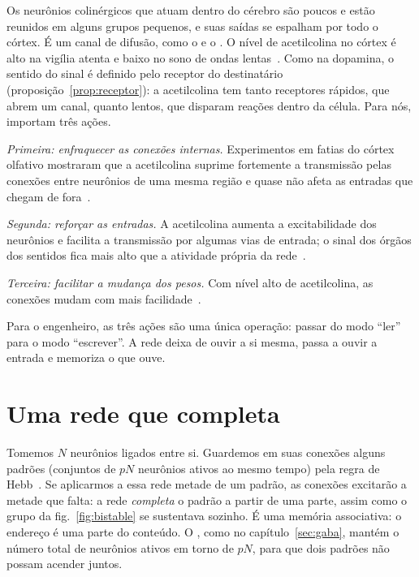 Os neurônios colinérgicos que atuam dentro do cérebro são poucos e estão reunidos em alguns grupos pequenos, e suas saídas se espalham por todo o córtex. É um canal de difusão, como o  e o . O nível de acetilcolina no córtex é alto na vigília atenta e baixo no sono de ondas lentas~\cite{Hasselmo1999}. Como na dopamina, o sentido do sinal é definido pelo receptor do destinatário (proposição~\ref{prop:receptor}): a acetilcolina tem tanto receptores rápidos, que abrem um canal, quanto lentos, que disparam reações dentro da célula. Para nós, importam três ações.

\emph{Primeira: enfraquecer as conexões internas.} Experimentos em fatias do córtex olfativo mostraram que a acetilcolina suprime fortemente a transmissão pelas conexões entre neurônios de uma mesma região e quase não afeta as entradas que chegam de fora~\cite{HasselmoBower1992}.

\emph{Segunda: reforçar as entradas.} A acetilcolina aumenta a excitabilidade dos neurônios e facilita a transmissão por algumas vias de entrada; o sinal dos órgãos dos sentidos fica mais alto que a atividade própria da rede~\cite{Hasselmo2006}.

\emph{Terceira: facilitar a mudança dos pesos.} Com nível alto de acetilcolina, as conexões mudam com mais facilidade~\cite{Hasselmo2006}.

Para o engenheiro, as três ações são uma única operação: passar do modo ``ler'' para o modo ``escrever''. A rede deixa de ouvir a si mesma, passa a ouvir a entrada e memoriza o que ouve.

\section{Uma rede que completa}

Tomemos $N$ neurônios  ligados entre si. Guardemos em suas conexões alguns padrões (conjuntos de $pN$ neurônios ativos ao mesmo tempo) pela regra de Hebb~\cite{Hebb1949}. Se aplicarmos a essa rede metade de um padrão, as conexões excitarão a metade que falta: a rede \emph{completa} o padrão a partir de uma parte, assim como o grupo da fig.~\ref{fig:bistable} se sustentava sozinho. É uma memória associativa: o endereço é uma parte do conteúdo. O , como no capítulo~\ref{sec:gaba}, mantém o número total de neurônios ativos em torno de $pN$, para que dois padrões não possam acender juntos.

